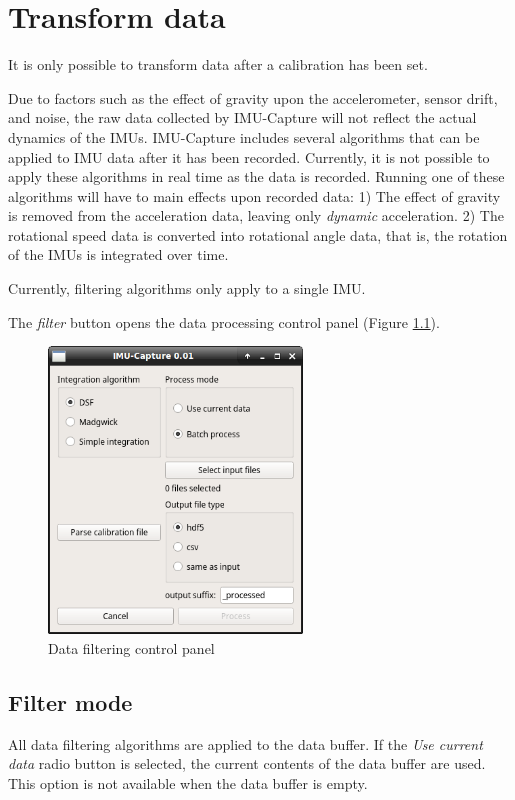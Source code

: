 \documentclass[11pt,letterpaper,article,oneside]{memoir}
\newcommand{\name}{IMU-Capture}
\begin{document}
\chapter{Transform data}

It is only possible to transform data after a calibration has been set.

Due to factors such as the effect of gravity upon the accelerometer, sensor
drift, and noise, the raw data collected by \name{} will not reflect the actual
dynamics of the IMUs. \name{} includes several algorithms that can be applied to
IMU data after it has been recorded. Currently, it is not possible to apply
these algorithms in real time as the data is recorded. Running one of these
algorithms will have to main effects upon recorded data: 1) The effect of
gravity is removed from the acceleration data, leaving only \emph{dynamic}
acceleration. 2) The rotational speed data is converted into rotational angle
data, that is, the rotation of the IMUs is integrated over time.

Currently, filtering algorithms only apply to a single IMU.

The \emph{filter} button opens the data processing control panel (Figure
\ref{fig:filter}).

\begin{figure}[]
    \begin{center}
        \includegraphics[height=3in]{screenshot_process}
    \end{center}
    \caption{Data filtering control panel} 
    \label{fig:filter}
\end{figure}



\section{Filter mode}
All data filtering algorithms are applied to the data buffer. If the \emph{Use
current data} radio button is selected, the current contents of the data buffer
are used. This option is not available when the data buffer is empty.
\end{document}
